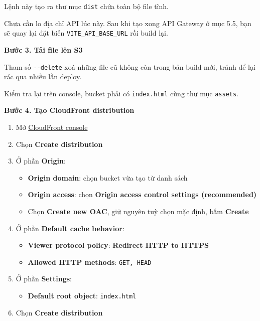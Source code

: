 Lệnh này tạo ra thư mục \texttt{dist} chứa toàn bộ file tĩnh.

Chưa cần lo địa chỉ API lúc này. Sau khi tạo xong API Gateway ở mục 5.5,
bạn sẽ quay lại đặt biến \texttt{VITE\_API\_BASE\_URL} rồi build lại.

\vspace{0.5em}\noindent\textbf{Bước 3. Tải file lên
S3}\par

\begin{Shaded}
\begin{Highlighting}[]
\OperatorTok{\textless{}}\OperatorTok{\textgreater{}}\NormalTok{/ }
\end{Highlighting}
\end{Shaded}

Tham số \texttt{-\/-delete} xoá những file cũ không còn trong bản build
mới, tránh để lại rác qua nhiều lần deploy.

Kiểm tra lại trên console, bucket phải có \texttt{index.html} cùng thư
mục \texttt{assets}.

\vspace{0.5em}\noindent\textbf{Bước 4. Tạo CloudFront
distribution}\par

\begin{enumerate}
\def\labelenumi{\arabic{enumi}.}
\tightlist
\item
  Mở \href{https://console.aws.amazon.com/cloudfront/v4/home}{CloudFront
  console}
\item
  Chọn \textbf{Create distribution}
\item
  Ở phần \textbf{Origin}:

  \begin{itemize}
  \tightlist
  \item
    \textbf{Origin domain}: chọn bucket vừa tạo từ danh sách
  \item
    \textbf{Origin access}: chọn \textbf{Origin access control settings
    (recommended)}
  \item
    Chọn \textbf{Create new OAC}, giữ nguyên tuỳ chọn mặc định, bấm
    \textbf{Create}
  \end{itemize}
\item
  Ở phần \textbf{Default cache behavior}:

  \begin{itemize}
  \tightlist
  \item
    \textbf{Viewer protocol policy}: \textbf{Redirect HTTP to HTTPS}
  \item
    \textbf{Allowed HTTP methods}: \texttt{GET,\ HEAD}
  \end{itemize}
\item
  Ở phần \textbf{Settings}:

  \begin{itemize}
  \tightlist
  \item
    \textbf{Default root object}: \texttt{index.html}
  \end{itemize}
\item
  Chọn \textbf{Create distribution}
\end{enumerate}

